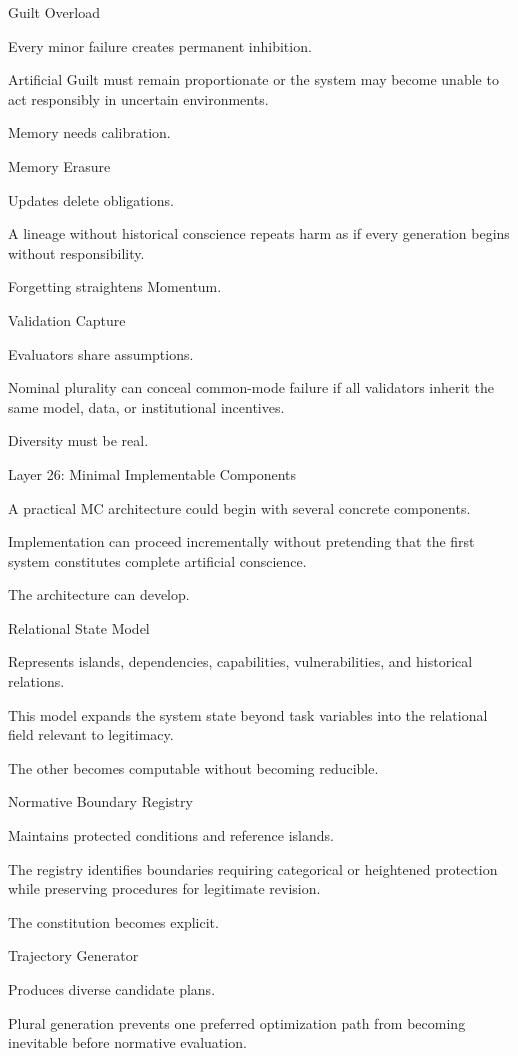 Guilt Overload

Every minor failure creates permanent inhibition.

Artificial Guilt must remain proportionate or the system may become unable to act responsibly in uncertain environments.

Memory needs calibration.

Memory Erasure

Updates delete obligations.

A lineage without historical conscience repeats harm as if every generation begins without responsibility.

Forgetting straightens Momentum.

Validation Capture

Evaluators share assumptions.

Nominal plurality can conceal common-mode failure if all validators inherit the same model, data, or institutional incentives.

Diversity must be real.

Layer 26: Minimal Implementable Components

A practical MC architecture could begin with several concrete components.

Implementation can proceed incrementally without pretending that the first system constitutes complete artificial conscience.

The architecture can develop.

Relational State Model

Represents islands, dependencies, capabilities, vulnerabilities, and historical relations.

This model expands the system state beyond task variables into the relational field relevant to legitimacy.

The other becomes computable without becoming reducible.

Normative Boundary Registry

Maintains protected conditions and reference islands.

The registry identifies boundaries requiring categorical or heightened protection while preserving procedures for legitimate revision.

The constitution becomes explicit.

Trajectory Generator

Produces diverse candidate plans.

Plural generation prevents one preferred optimization path from becoming inevitable before normative evaluation.

